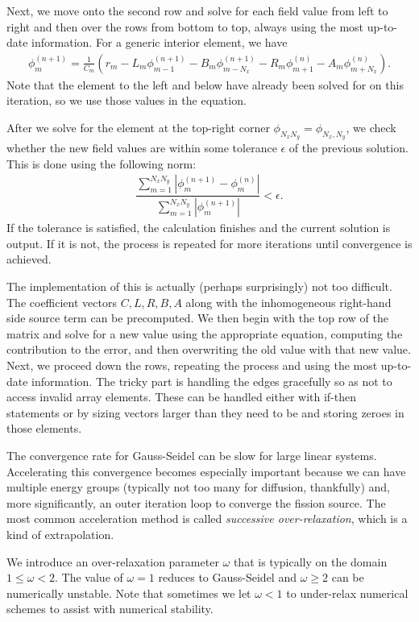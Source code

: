 Next, we move onto the second row and solve for each field value from left to right and then over the rows from bottom to top, always using the most up-to-date information. For a generic interior element, we have
\begin{align}
  \phi_m^{(n+1)} = \frac{1}{C_m} \left( r_m - L_m \phi_{m-1}^{(n+1)} - B_m \phi_{m-N_x}^{(n+1)} - R_{m} \phi_{m+1}^{(n)} - A_{m} \phi_{m+N_x}^{(n)} \right) .
\end{align}
Note that the element to the left and below have already been solved for on this iteration, so we use those values in the equation.

After we solve for the element at the top-right corner $\phi_{N_x N_y} = \phi_{N_x,N_y}$, we check whether the new field values are within some tolerance $\epsilon$ of the previous solution. This is done using the following norm:
\begin{align}
  \dfrac{ \sum_{m=1}^{N_x N_y}  | \phi_{m}^{(n+1)} - \phi_{m}^{(n)} | }{ \sum_{m=1}^{N_x N_y}  | \phi_{m}^{(n+1)} | }  < \epsilon .
\end{align} 
If the tolerance is satisfied, the calculation finishes and the current solution is output. If it is not, the process is repeated for more iterations until convergence is achieved.

The implementation of this is actually (perhaps surprisingly) not too difficult. The coefficient vectors $C, L, R, B, A$ along with the inhomogeneous right-hand side source term can be precomputed. We then begin with the top row of the matrix and solve for a new value using the appropriate equation, computing the contribution to the error, and then overwriting the old value with that new value. Next, we proceed down the rows, repeating the process and using the most up-to-date information. The tricky part is handling the edges gracefully so as not to access invalid array elements. These can be handled either with if-then statements or by sizing vectors larger than they need to be and storing zeroes in those elements.

The convergence rate for Gauss-Seidel can be slow for large linear systems. Accelerating this convergence becomes especially important because we can have multiple energy groups (typically not too many for diffusion, thankfully) and, more significantly, an outer iteration loop to converge the fission source. The most common acceleration method is called \emph{successive over-relaxation}, which is a kind of extrapolation.

We introduce an over-relaxation parameter $\omega$ that is typically on the domain $1 \le \omega < 2$. The value of $\omega = 1$ reduces to Gauss-Seidel and $\omega \ge 2$ can be numerically unstable. Note that sometimes we let $\omega < 1$ to under-relax numerical schemes to assist with numerical stability. 

